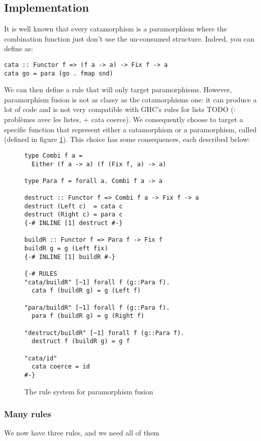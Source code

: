\subsection{Implementation}
\label{sec:para-impl}

It is well known that every catamorphism is a paramorphism where the combination function just don't use the un-consumed structure. Indeed, you can define  as:
\begin{verbatim}
cata :: Functor f => (f a -> a) -> Fix f -> a
cata go = para (go . fmap snd)
\end{verbatim}

\noindent We can then define a rule that will only target paramorphisms. However, paramorphism fusion is not as classy as the catamorphisms one: it can produce a lot of code and is not very compatible with GHC's rules for lists TODO (: problèmes avec les listes, + cata coerce). We consequently choose to target a specific function that represent either a catamorphism or a paramorphism, called  (defined in figure \ref{fig:para}). This choice has some consequences, each described below:

\begin{figure}
\begin{verbatim}
type Combi f a =
  Either (f a -> a) (f (Fix f, a) -> a)
  
type Para f = forall a. Combi f a -> a 

destruct :: Functor f => Combi f a -> Fix f -> a
destruct (Left c)  = cata c
destruct (Right c) = para c
{-# INLINE [1] destruct #-}

buildR :: Functor f => Para f -> Fix f
buildR g = g (Left fix)
{-# INLINE [1] buildR #-}

{-# RULES
"cata/buildR" [~1] forall f (g::Para f).
  cata f (buildR g) = g (Left f)

"para/buildR" [~1] forall f (g::Para f).
  para f (buildR g) = g (Right f)

"destruct/buildR" [~1] forall f (g::Para f).
  destruct f (buildR g) = g f

"cata/id"
  cata coerce = id
#-}

\end{verbatim}
\caption{The rule system for paramorphism fusion}
\label{fig:para}
\end{figure}

\subsubsection{Many rules}
We now have three rules, and we need all of them

